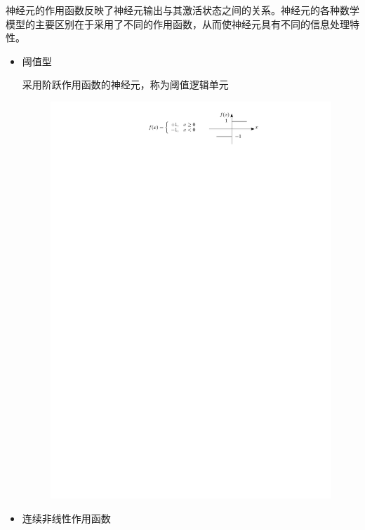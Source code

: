 神经元的作用函数反映了神经元输出与其激活状态之间的关系。神经元的各种数学模型的主要区别在于采用了不同的作用函数，从而使神经元具有不同的信息处理特性。
\begin{itemize}
    \item 阈值型
    
    \textcolor{main1}{采用阶跃作用函数的神经元，称为阈值逻辑单元}
    \begin{figure}[htbp]
        \centering
        \includegraphics{image/阈值型f.pdf}
    \end{figure}
    \item 连续非线性作用函数
    \begin{figure}[htbp]
        \centering

\end{figure}
\end{itemize}
